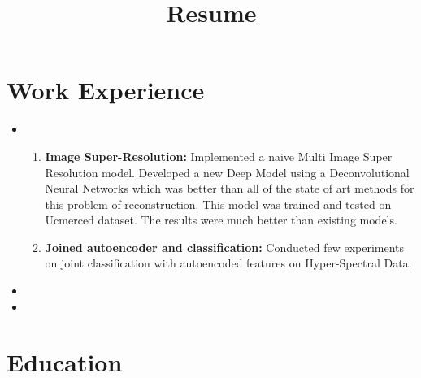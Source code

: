 \documentclass[10pt,a4paper,sans]{moderncv}        %
\title{Resume}                               %
\begin{document}
\makecvtitle


\section{Work Experience}

\vspace{2pt}

\begin{itemize}

	\item{} \begin{enumerate}
			 \item \textbf{Image Super-Resolution:}
				 Implemented a naive Multi Image Super Resolution model.
				 Developed a new Deep Model using a Deconvolutional Neural
				 Networks which was better than all of the state of art methods
				 for
				 this problem of reconstruction. This model was trained and tested on Ucmerced dataset. The results were much
				 better than existing models.
			\vspace{3pt}
			 \item \textbf{Joined autoencoder and classification:}
					 Conducted few experiments on joint classification with
					 autoencoded features on Hyper-Spectral Data.%
		\end{enumerate}
	\vspace{3pt}	
\item{}
\item{}
\vspace{3pt}


\end{itemize}

\section{Education}
\end{document}
